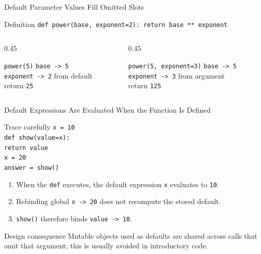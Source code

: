 \documentclass[aspectratio=169,10pt]{beamer}
\begin{document}
\begin{frame}{Default Parameter Values Fill Omitted Slots}
  \begin{block}{Definition}
    \texttt{def power(base, exponent=2):}\
    \hspace*{0.20in}\texttt{return base ** exponent}
  \end{block}

  \begin{columns}[T,onlytextwidth]
    \begin{column}{0.45\textwidth}
      \begin{block}{\texttt{power(5)}}
        \texttt{base -> 5}\\
        \texttt{exponent -> 2} from default\\
        return \texttt{25}
      \end{block}
    \end{column}

    \begin{column}{0.45\textwidth}
      \begin{block}{\texttt{power(5, exponent=3)}}
        \texttt{base -> 5}\\
        \texttt{exponent -> 3} from argument\\
        return \texttt{125}
      \end{block}
    \end{column}
  \end{columns}
\end{frame}

\begin{frame}{Default Expressions Are Evaluated When the Function Is Defined}
  \begin{block}{Trace carefully}
    \texttt{x = 10}\\
    \texttt{def show(value=x):}\\
    \hspace*{0.20in}\texttt{return value}\\[0.06in]
    \texttt{x = 20}\\
    \texttt{answer = show()}
  \end{block}

  \begin{enumerate}
    \item When the \texttt{def} executes, the default expression \texttt{x} evaluates to \texttt{10}.
    \item Rebinding global \texttt{x -> 20} does not recompute the stored default.
    \item \texttt{show()} therefore binds \texttt{value -> 10}.
  \end{enumerate}

  \begin{alertblock}{Design consequence}
    Mutable objects used as defaults are shared across calls that omit that argument; this is usually avoided in introductory code.
  \end{alertblock}
\end{frame}
\end{document}
